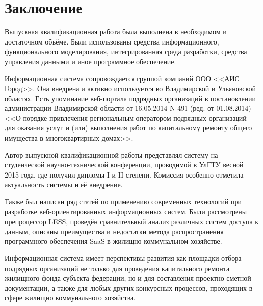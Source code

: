 \section*{Заключение}

Выпускная квалификационная работа была выполнена в необходимом и достаточном объёме.
Были использованы средства информационного, функционального моделирования, интегрированная среда разработки, средства управления данными и иное программное обеспечение.

Информационная система сопровождается группой компаний ООО <<АИС Город>>.
Она внедрена и активно используется во Владимирской и Ульяновской областях.
Есть упоминание веб-портала подрядных организаций в постановлении администрации Владимирской области от 16.05.2014 N 491 (ред. от 01.08.2014) <<О порядке привлечения региональным оператором подрядных организаций для оказания услуг и (или) выполнения работ по капитальному ремонту общего имущества в многоквартирных домах>>.

Автор выпускной квалификационной работы представлял систему на студенческой научно-технической конференции, проводимой в УлГТУ весной 2015 года, где получил дипломы I и II степени.
Комиссия особенно отметила актуальность системы и её внедрение.

Также был написан ряд статей по применению современных технологий при разработке веб-ориентированных информационных систем.
Были рассмотрены препроцессор LESS, проведён сравнительный анализ различных систем доступа к данным, описаны преимущества и недостатки метода распространения программного обеспечения SaaS в жилищно-коммунальном хозяйстве.

Информационная система имеет перспективы развития как площадки отбора подрядных организаций не только для проведения капитального ремонта жилищного фонда субъекта федерации, но и для составления проектно-сметной документации, а также для любых других конкурсных процессов, проходящих в сфере жилищно коммунального хозяйства.

\clearpage
\newpage